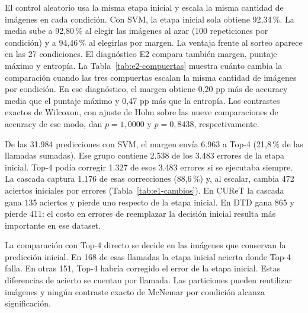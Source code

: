 \documentclass[a4paper,fleqn]{cas-sc}
\begin{document}
El control aleatorio usa la misma etapa inicial y escala la misma cantidad de imágenes en cada condición. Con SVM, la etapa inicial sola obtiene 92,34\,\%. La media sube a 92,80\,\% al elegir las imágenes al azar (100 repeticiones por condición) y a 94,46\,\% al elegirlas por margen. La ventaja frente al sorteo aparece en las 27 condiciones. El diagnóstico E2 compara también margen, puntaje máximo y entropía. La Tabla~\ref{tab:e2-compuertas} muestra cuánto cambia la comparación cuando las tres compuertas escalan la misma cantidad de imágenes por condición. En ese diagnóstico, el margen obtiene 0,20 pp más de accuracy media que el puntaje máximo y 0,47 pp más que la entropía. Los contrastes exactos de Wilcoxon, con ajuste de Holm sobre las nueve comparaciones de accuracy de ese modo, dan $p=1{,}0000$ y $p=0{,}8438$, respectivamente.

De las 31.984 predicciones con SVM, el margen envía 6.963 a Top-4 (21,8\,\% de las llamadas sumadas). Ese grupo contiene 2.538 de los 3.483 errores de la etapa inicial. Top-4 podía corregir 1.327 de esos 3.483 errores si se ejecutaba siempre. La cascada captura 1.176 de esas correcciones (88,6\,\%) y, al escalar, cambia 472 aciertos iniciales por errores (Tabla~\ref{tab:e1-cambios}). En CUReT la cascada gana 135 aciertos y pierde uno respecto de la etapa inicial. En DTD gana 865 y pierde 411: el costo en errores de reemplazar la decisión inicial resulta más importante en ese dataset.

La comparación con Top-4 directo se decide en las imágenes que conservan la predicción inicial. En 168 de esas llamadas la etapa inicial acierta donde Top-4 falla. En otras 151, Top-4 habría corregido el error de la etapa inicial. Estas diferencias de acierto se cuentan por llamada. Las particiones pueden reutilizar imágenes y ningún contraste exacto de McNemar por condición alcanza significación.
\end{document}
